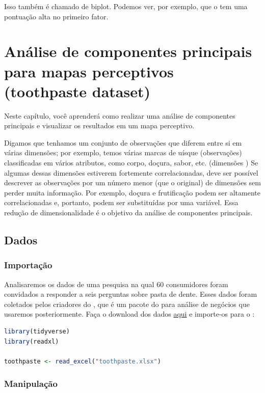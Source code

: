 \documentclass{article}
\begin{document}
Isso também é chamado de biplot. Podemos ver, por exemplo, que o  tem uma pontuação alta no primeiro fator.

\newpage
\section{Análise de componentes principais para mapas perceptivos (toothpaste dataset)}

Neste capítulo, você aprenderá como realizar uma análise de componentes principais e visualizar os resultados em um mapa perceptivo.

Digamos que tenhamos um conjunto de observações que diferem entre si em várias dimensões; por exemplo, temos várias marcas de uísque (observações) classificadas em vários atributos, como corpo, doçura, sabor, etc. (dimensões ) Se algumas dessas dimensões estiverem fortemente correlacionadas, deve ser possível descrever as observações por um número menor (que o original) de dimensões sem perder muita informação. Por exemplo, doçura e frutificação podem ser altamente correlacionadas e, portanto, podem ser substituídas por uma variável. Essa redução de dimensionalidade é o objetivo da análise de componentes principais.

\subsection{Dados}
\subsubsection{Importação}

Analisaremos os dados de uma pesquisa na qual 60 consumidores foram convidados a responder a seis perguntas sobre pasta de dente. Esses dados foram coletados pelos criadores do , que é um pacote do \faRProject para análise de negócios que usaremos posteriormente. Faça o download dos dados \href{http://users.telenet.be/samuelfranssens/tutorial_data/toothpaste.xlsx}{aqui} e importe-os para o \faRProject:

\begin{lstlisting}[language=R]
library(tidyverse)
library(readxl)

toothpaste <- read_excel("toothpaste.xlsx")

\end{lstlisting}

\subsubsection{Manipulação}
\end{document}
